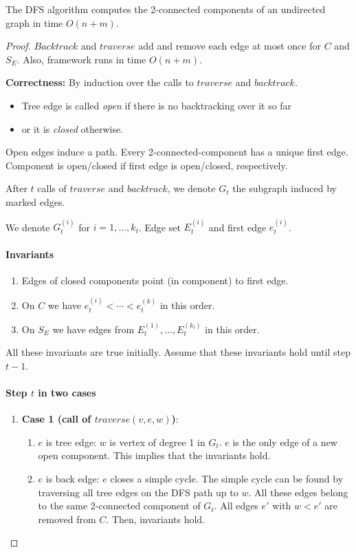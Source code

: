 \begin{mytheorem}
The DFS algorithm computes the 2-connected components of an undirected graph in time $O(n+m)$.
\end{mytheorem}
\begin{proof}
$Backtrack$ and $traverse$ add and remove each edge at most once for $C$ and $S_E$. Also, framework runs in time $O(n+m)$.

\textbf{Correctness:} By induction over the calls to $traverse$ and $backtrack$.

\begin{itemize}
\item Tree edge is called \emph{open} if there is no backtracking over it so far
\item or it is \emph{closed} otherwise.
\end{itemize}

Open edges induce a path. Every 2-connected-component has a unique first edge. Component is open/closed if first edge is open/closed, respectively.

After $t$ calls of $traverse$ and $backtrack$, we denote $G_t$ the subgraph induced by marked edges.

We denote $G_t^{(i)}$ for $i = 1, \ldots, k_t$. Edge set $E_t^{(i)}$ and first edge $e_t^{(i)}$.

\paragraph{Invariants}

\begin{enumerate}
\item Edges of closed components point (in component) to first edge.
\item On $C$ we have $e_t^{(i)} < \cdots < e_t^{(k)}$ in this order.
\item On $S_E$ we have edges from $E_t^{(1)}, \ldots, E_t^{(k_t)}$ in this order.
\end{enumerate}

All these invariants are true initially. Assume that these invariants hold until step $t-1$.

\paragraph{Step $t$ in two cases}

\begin{enumerate}
\item \textbf{Case 1 (call of $traverse(v,e,w)$)}: 
    \begin{enumerate}
    \item $e$ is tree edge: $w$ is vertex of degree 1 in $G_t$. $e$ is the only edge of a new open component. This implies that the invariants hold.
    \item $e$ is back edge: $e$ closes a simple cycle. The simple cycle can be found by traversing all tree edges on the DFS path up to $w$. All these edges belong to the same 2-connected component of $G_t$. All edges $e'$ with $w < e'$ are removed from $C$. Then, invariants hold.
    \end{enumerate}
    

\end{enumerate}
\end{proof}
